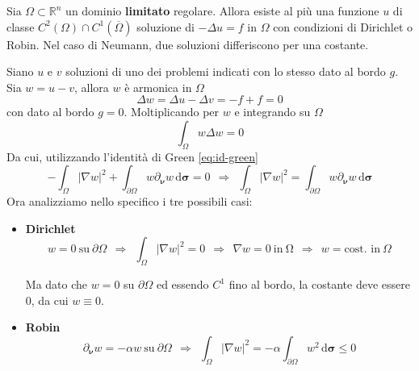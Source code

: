 \documentclass[10pt,a4paper,twoside,openright]{book}
\newcommand{\sigg}{\bm{\sigma}}
\newcommand{\nuu}{\bm{\nu}}
\newcommand{\de}{\,\mathrm d}
\newcommand{\dsig}{\de \sigg}
\begin{document}
\begin{theorem}[Unicità]
    Sia $\Omega \subset \mathbb{R}^{n}$ un dominio \textbf{limitato} regolare. Allora esiste al più una funzione $u$ di classe $C^{2}(\Omega) \cap C^{1}(\overline{\Omega })$ soluzione di $-\Delta u=f$ in $\Omega $ con condizioni di Dirichlet o Robin. Nel caso di Neumann, due soluzioni differiscono per una costante.
\end{theorem}
\begin{dimostrazione}
    Siano $u$ e $v$ soluzioni di uno dei problemi indicati con lo stesso dato al bordo $g$. Sia $w=u-v$, allora $w$ è armonica in $\Omega $
    \begin{equation*}
        \Delta w=\Delta u-\Delta v=-f+f=0
    \end{equation*}
    con dato al bordo $g=0$. Moltiplicando per $w$ e integrando su $\Omega $
    \begin{equation*}
        \int _{\Omega } w\Delta w=0
    \end{equation*}
    Da cui, utilizzando l'identità di Green \eqref{eq:id-green}
    \begin{equation*}
        -\int _{\Omega }| \nabla w| ^{2} +\int _{\partial \Omega } w\partial _{\nuu} w\dsig =0\ \ \Rightarrow \ \ \int _{\Omega }| \nabla w| ^{2} =\int _{\partial \Omega } w\partial _{\nuu} w\dsig
    \end{equation*}
    Ora analizziamo nello specifico i tre possibili casi:
    \begin{itemize}
        \item \textbf{Dirichlet}
              \begin{equation*}
                  w=0\ \text{su} \ \partial \Omega \ \ \Rightarrow \ \ \int _{\Omega }| \nabla w| ^{2} =0\ \ \Rightarrow \ \ \nabla w=0\ \text{in} \ \mathrm{\Omega } \ \ \Rightarrow \ \ w=\text{cost. in} \ \Omega
              \end{equation*}

              Ma dato che $w=0$ su $\displaystyle \partial \Omega $ ed essendo $\displaystyle C^{1}$ fino al bordo, la costante deve essere $0$, da cui $\displaystyle w\equiv 0$.
        \item \textbf{Robin}
              \begin{equation*}
                  \partial_{\nuu} w=-\alpha w\ \text{su} \ \partial \Omega \ \ \Rightarrow \ \ \int _{\Omega }| \nabla w| ^{2} =-\alpha \int _{\partial \Omega } w^{2} \dsig \leqslant 0
              \end{equation*}


\end{itemize}
\end{dimostrazione}
\end{document}
